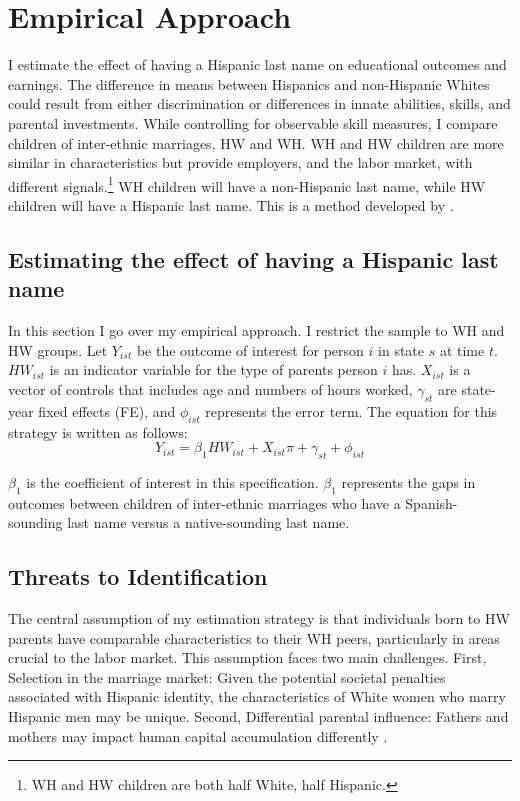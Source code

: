 \documentclass[a4paper,fleqn]{cas-sc}
\begin{document}
\section{Empirical Approach}\label{sec:emp_model}

I estimate the effect of having a Hispanic last name on educational outcomes and earnings. The difference in means between Hispanics and non-Hispanic Whites could result from either discrimination or differences in innate abilities, skills, and parental investments. While controlling for observable skill measures, I compare children of inter-ethnic marriages, HW and WH. WH and HW children are more similar in characteristics but provide employers, and the labor market, with different signals.\footnote{WH and HW children are both half White, half Hispanic.} WH children will have a non-Hispanic last name, while HW children will have a Hispanic last name. This is a method developed by \citet{rubinstein2014pride}.

\subsection{Estimating the effect of having a Hispanic last name}

In this section I go over my empirical approach. I restrict the sample to WH and HW groups. Let $Y_{ist}$ be the outcome of interest for person $i$ in state $s$ at time $t$. $HW_{ist}$ is an indicator variable for the type of parents person $i$ has. $X_{ist}$ is a vector of controls that includes age and numbers of hours worked, $\gamma_{st}$ are state-year fixed effects (FE), and $\phi_{ist}$ represents the error term. The equation for this strategy is written as follows:
\begin{equation} \label{eq:1a}
Y_{ist} = \beta_{1} HW_{ist} + X_{ist} \pi + \gamma_{st} + \phi_{ist}
\end{equation}

$\beta_{1}$ is the coefficient of interest in this specification. $\beta_{1}$ represents the gaps in outcomes between children of inter-ethnic marriages who have a Spanish-sounding last name versus a native-sounding last name. 

\subsection{Threats to Identification}

The central assumption of my estimation strategy is that individuals born to HW parents have comparable characteristics to their WH peers, particularly in areas crucial to the labor market. This assumption faces two main challenges. First, Selection in the marriage market: Given the potential societal penalties associated with Hispanic identity, the characteristics of White women who marry Hispanic men may be unique. Second, Differential parental influence: Fathers and mothers may impact human capital accumulation differently \citep{kimball2009risk,magruder2010intergenerational}.
\end{document}
